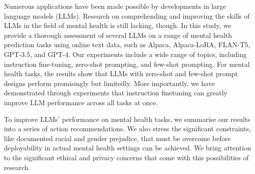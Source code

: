 Numerous applications have been made possible by developments in large language models (LLMs). Research on comprehending and improving the skills of LLMs in the field of mental health is still lacking, though. In this study, we provide a thorough assessment of several LLMs on a range of mental health prediction tasks using online text data, such as Alpaca, Alpaca-LoRA, FLAN-T5, GPT-3.5, and GPT-4. Our experiments include a wide range of topics, including instruction fine-tuning, zero-shot prompting, and few-shot prompting. For mental health tasks, the results show that LLMs with zero-shot and few-shot prompt designs perform promisingly but limitedly. More importantly, we have demonstrated through experiments that instruction finetuning can greatly improve LLM performance across all tasks at once.

To improve LLMs' performance on mental health tasks, we summarise our results into a series of action recommendations. We also stress the significant constraints, like documented racial and gender prejudice, that must be overcome before deployability in actual mental health settings can be achieved. We bring attention to the significant ethical and privacy concerns that come with this possibilities of research.